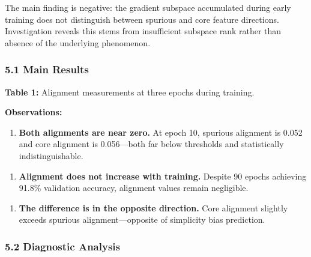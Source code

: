
The main finding is negative: the gradient subspace accumulated during early training does not distinguish between spurious and core feature directions. Investigation reveals this stems from insufficient subspace rank rather than absence of the underlying phenomenon.

\subsubsection{5.1 Main Results}

\textbf{Table 1:} Alignment measurements at three epochs during training.

\begin{table}[htbp]
\centering
{}
\end{table}

\textbf{Observations:}

\begin{enumerate}
\item \textbf{Both alignments are near zero.} At epoch 10, spurious alignment is 0.052 and core alignment is 0.056---both far below thresholds and statistically indistinguishable.
\end{enumerate}

\begin{enumerate}
\item \textbf{Alignment does not increase with training.} Despite 90 epochs achieving 91.8\% validation accuracy, alignment values remain negligible.
\end{enumerate}

\begin{enumerate}
\item \textbf{The difference is in the opposite direction.} Core alignment slightly exceeds spurious alignment---opposite of simplicity bias prediction.
\end{enumerate}

\subsubsection{5.2 Diagnostic Analysis}

